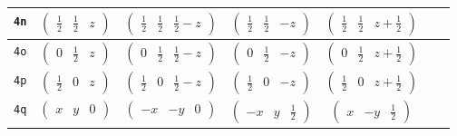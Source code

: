 \documentclass[fleqn,9pt,landscape]{jsarticle}
\begin{document}
\begin{center}
\begin{longtable}{ccccccc}
{\tt 4n} & $ \begin{pmatrix} \frac{1}{2} & \frac{1}{2} & z \end{pmatrix} $ & $ \begin{pmatrix} \frac{1}{2} & \frac{1}{2} & \frac{1}{2} - z \end{pmatrix} $ & $ \begin{pmatrix} \frac{1}{2} & \frac{1}{2} & - z \end{pmatrix} $ & $ \begin{pmatrix} \frac{1}{2} & \frac{1}{2} & z + \frac{1}{2} \end{pmatrix} $ & $  $ & $  $ \\ \hline
{\tt 4o} & $ \begin{pmatrix} 0 & \frac{1}{2} & z \end{pmatrix} $ & $ \begin{pmatrix} 0 & \frac{1}{2} & \frac{1}{2} - z \end{pmatrix} $ & $ \begin{pmatrix} 0 & \frac{1}{2} & - z \end{pmatrix} $ & $ \begin{pmatrix} 0 & \frac{1}{2} & z + \frac{1}{2} \end{pmatrix} $ & $  $ & $  $ \\ \hline
{\tt 4p} & $ \begin{pmatrix} \frac{1}{2} & 0 & z \end{pmatrix} $ & $ \begin{pmatrix} \frac{1}{2} & 0 & \frac{1}{2} - z \end{pmatrix} $ & $ \begin{pmatrix} \frac{1}{2} & 0 & - z \end{pmatrix} $ & $ \begin{pmatrix} \frac{1}{2} & 0 & z + \frac{1}{2} \end{pmatrix} $ & $  $ & $  $ \\ \hline
{\tt 4q} & $ \begin{pmatrix} x & y & 0 \end{pmatrix} $ & $ \begin{pmatrix} - x & - y & 0 \end{pmatrix} $ & $ \begin{pmatrix} - x & y & \frac{1}{2} \end{pmatrix} $ & $ \begin{pmatrix} x & - y & \frac{1}{2} \end{pmatrix} $ & $  $ & $  $ \\ \hline

\end{longtable}
\end{center}
\end{document}
